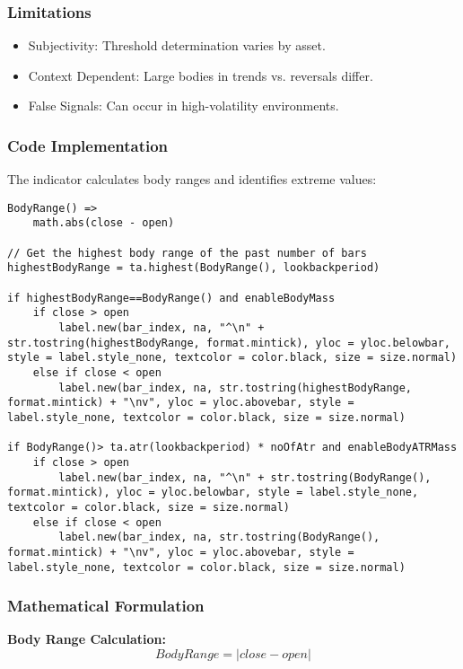 \documentclass[12pt]{article}
\begin{document}
\subsubsection{Limitations}
\begin{itemize}
\item Subjectivity: Threshold determination varies by asset.
\item Context Dependent: Large bodies in trends vs. reversals differ.
\item False Signals: Can occur in high-volatility environments.
\end{itemize}

\subsubsection{Code Implementation}
The indicator calculates body ranges and identifies extreme values:

\begin{lstlisting}[language=Pine, caption=Pine Script Code for Body Mass Indicator]
BodyRange() =>
	math.abs(close - open) 

// Get the highest body range of the past number of bars
highestBodyRange = ta.highest(BodyRange(), lookbackperiod)

if highestBodyRange==BodyRange() and enableBodyMass
	if close > open
    	label.new(bar_index, na, "^\n" + str.tostring(highestBodyRange, format.mintick), yloc = yloc.belowbar, style = label.style_none, textcolor = color.black, size = size.normal)
	else if close < open
		label.new(bar_index, na, str.tostring(highestBodyRange, format.mintick) + "\nv", yloc = yloc.abovebar, style = label.style_none, textcolor = color.black, size = size.normal)

if BodyRange()> ta.atr(lookbackperiod) * noOfAtr and enableBodyATRMass
	if close > open
    	label.new(bar_index, na, "^\n" + str.tostring(BodyRange(), format.mintick), yloc = yloc.belowbar, style = label.style_none, textcolor = color.black, size = size.normal)
	else if close < open
		label.new(bar_index, na, str.tostring(BodyRange(), format.mintick) + "\nv", yloc = yloc.abovebar, style = label.style_none, textcolor = color.black, size = size.normal)
\end{lstlisting}

\subsubsection{Mathematical Formulation}
\textbf{Body Range Calculation:}
\[
BodyRange = |close - open|
\]
\end{document}
